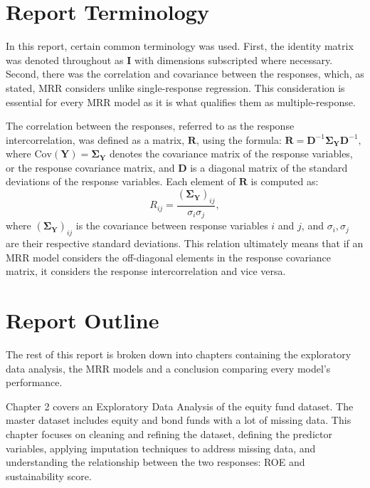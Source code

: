 \documentclass[11pt]{report} %
\begin{document}
\section{Report Terminology}
In this report, certain common terminology was used. First, the identity matrix was denoted throughout as $\mathbf{I}$ with dimensions subscripted where necessary. Second, there was the correlation and covariance between the responses, which, as stated, MRR considers unlike single-response regression. This consideration is essential for every MRR model as it is what qualifies them as multiple-response. 

The correlation between the responses, referred to as the response intercorrelation, was defined as a matrix, $\mathbf{R}$, using the formula: 
$
\mathbf{R} = \mathbf{D}^{-1} \mathbf{\Sigma_Y} \mathbf{D}^{-1},
$ %
\noindent where \( \text{Cov}(\mathbf{Y})=\mathbf{\Sigma_Y} \) denotes the covariance matrix of the response variables, or the response covariance matrix, and \( \mathbf{D} \) is a diagonal matrix of the standard deviations of the response variables.\cite{mardia2024multivariate}
Each element of \( \mathbf{R} \) is computed as: %
\[
    R_{ij} = \frac{(\mathbf{\Sigma_Y})_{ij}}{\sigma_i \sigma_j},
\] %
where \( (\mathbf{\Sigma_Y})_{ij} \) is the covariance between response variables \( i \) and \( j \), and \( \sigma_i, \sigma_j \) are their respective standard deviations.\cite{mardia2024multivariate}
This relation ultimately means that if an MRR model considers the off-diagonal elements in the response covariance matrix, it considers the response intercorrelation and vice versa. 

\section{Report Outline}
The rest of this report is broken down into chapters containing the exploratory data analysis, the MRR models and a conclusion comparing every model's performance.

Chapter 2 covers an Exploratory Data Analysis of the equity fund dataset. The master dataset includes equity and bond funds with a lot of missing data. This chapter focuses on cleaning and refining the dataset, defining the predictor variables,  applying imputation techniques to address missing data, and understanding the relationship between the two responses: ROE and sustainability score.
\end{document}
